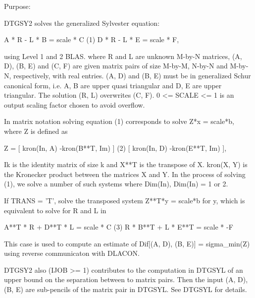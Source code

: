  \begin{DoxyParagraph}{Purpose\+: }
\begin{DoxyVerb} DTGSY2 solves the generalized Sylvester equation:

             A * R - L * B = scale * C                (1)
             D * R - L * E = scale * F,

 using Level 1 and 2 BLAS. where R and L are unknown M-by-N matrices,
 (A, D), (B, E) and (C, F) are given matrix pairs of size M-by-M,
 N-by-N and M-by-N, respectively, with real entries. (A, D) and (B, E)
 must be in generalized Schur canonical form, i.e. A, B are upper
 quasi triangular and D, E are upper triangular. The solution (R, L)
 overwrites (C, F). 0 <= SCALE <= 1 is an output scaling factor
 chosen to avoid overflow.

 In matrix notation solving equation (1) corresponds to solve
 Z*x = scale*b, where Z is defined as

        Z = [ kron(In, A)  -kron(B**T, Im) ]             (2)
            [ kron(In, D)  -kron(E**T, Im) ],

 Ik is the identity matrix of size k and X**T is the transpose of X.
 kron(X, Y) is the Kronecker product between the matrices X and Y.
 In the process of solving (1), we solve a number of such systems
 where Dim(In), Dim(In) = 1 or 2.

 If TRANS = 'T', solve the transposed system Z**T*y = scale*b for y,
 which is equivalent to solve for R and L in

             A**T * R  + D**T * L   = scale * C           (3)
             R  * B**T + L  * E**T  = scale * -F

 This case is used to compute an estimate of Dif[(A, D), (B, E)] =
 sigma_min(Z) using reverse communicaton with DLACON.

 DTGSY2 also (IJOB >= 1) contributes to the computation in DTGSYL
 of an upper bound on the separation between to matrix pairs. Then
 the input (A, D), (B, E) are sub-pencils of the matrix pair in
 DTGSYL. See DTGSYL for details.\end{DoxyVerb}
 
\end{DoxyParagraph}

